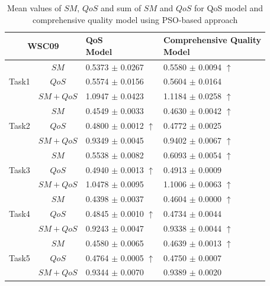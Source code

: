\begin{table}[]
\footnotesize
\centering
\caption{Mean values of $SM$, $QoS$ and sum of $SM$ and $QoS$ for QoS model and comprehensive quality model using PSO-based approach}
\label{decisionTable}
\begin{tabular}{c|c|l|l}
\hline
\multicolumn{2}{c|}{WSC09}              & \shortstack{QoS \\ Model}         &\shortstack{Comprehensive Quality \\ Model} \\ \hline
\multirow{3}{*}{Task1}  &$SM$      &0.5373 $\pm$ 0.0267               &0.5580 $\pm$ 0.0094 $\uparrow$ \\ \cline{2-4}
                        &$QoS$     &0.5574 $\pm$ 0.0156               &0.5604 $\pm$ 0.0164            \\ \cline{2-4}
                        &$SM+QoS$  &1.0947 $\pm$ 0.0423               &1.1184 $\pm$ 0.0258 $\uparrow$ \\ \hline
\multirow{3}{*}{Task2}  &$SM$      &0.4549 $\pm$ 0.0033               &0.4630 $\pm$ 0.0042 $\uparrow$ \\ \cline{2-4} 
                        &$QoS$     &0.4800 $\pm$ 0.0012 $\uparrow$    &0.4772 $\pm$ 0.0025            \\ \cline{2-4}
                        &$SM+QoS$  &0.9349 $\pm$ 0.0045               &0.9402 $\pm$ 0.0067 $\uparrow$           \\ \hline
\multirow{3}{*}{Task3}  &$SM$      &0.5538 $\pm$ 0.0082               &0.6093 $\pm$ 0.0054 $\uparrow$ \\ \cline{2-4} 
                        &$QoS$     &0.4940 $\pm$ 0.0013 $\uparrow$    &0.4913 $\pm$ 0.0009            \\ \cline{2-4}
                        &$SM+QoS$  &1.0478 $\pm$ 0.0095               &1.1006 $\pm$ 0.0063 $\uparrow$           \\ \hline
\multirow{3}{*}{Task4}  &$SM$      &0.4398 $\pm$ 0.0037               &0.4604 $\pm$ 0.0000 $\uparrow$ \\ \cline{2-4} 
                        &$QoS$     &0.4845 $\pm$ 0.0010 $\uparrow$    &0.4734 $\pm$ 0.0044            \\ \cline{2-4}
                        &$SM+QoS$  &0.9243 $\pm$ 0.0047               &0.9338 $\pm$ 0.0044 $\uparrow$           \\ \hline
\multirow{3}{*}{Task5}  &$SM$      &0.4580 $\pm$ 0.0065               &0.4639 $\pm$ 0.0013 $\uparrow$ \\ \cline{2-4} 
                        &$QoS$     &0.4764 $\pm$ 0.0005 $\uparrow$    &0.4750 $\pm$ 0.0007            \\ \cline{2-4}
                        &$SM+QoS$  &0.9344 $\pm$ 0.0070               &0.9389 $\pm$ 0.0020           \\ \hline
\end{tabular}
\end{table}

